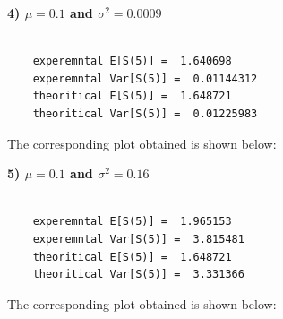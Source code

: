\documentclass[12pt]{book}
\begin{document}
\newpage
\textbf{4) $\mu=0.1$ and $\sigma ^2=0.0009$}\\\\
\begin{lstlisting}
	experemntal E[S(5)] =  1.640698 
	experemntal Var[S(5)] =  0.01144312 
	theoritical E[S(5)] =  1.648721 
	theoritical Var[S(5)] =  0.01225983
\end{lstlisting}
The corresponding plot obtained is shown below:
\begin{figure}[H]
	\centering
\end{figure}
\newpage
\textbf{5) $\mu=0.1$ and $\sigma ^2=0.16$}\\\\
\begin{lstlisting}
	experemntal E[S(5)] =  1.965153 
	experemntal Var[S(5)] =  3.815481 
	theoritical E[S(5)] =  1.648721 
	theoritical Var[S(5)] =  3.331366 
\end{lstlisting}
The corresponding plot obtained is shown below:
\begin{figure}[H]
	\centering
\end{figure}
\end{document}

